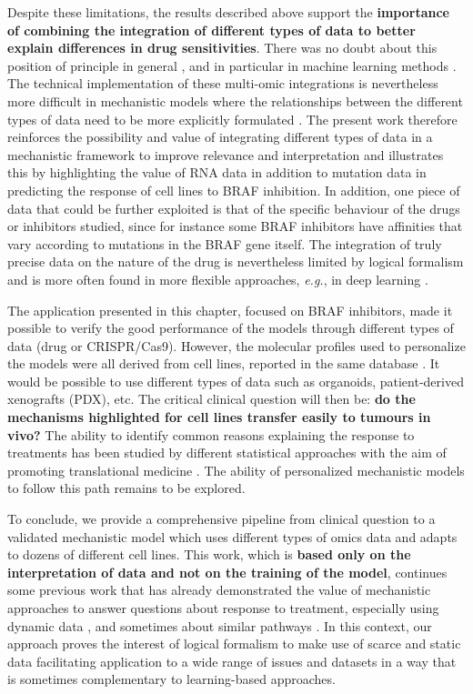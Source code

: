 \documentclass[a4paper,12pt,twoside,onecolumn,openright,final,oldfontcommands]{memoir}
\begin{document}
Despite these limitations, the results described above support the
\textbf{importance of combining the integration of different types of
data to better explain differences in drug sensitivities}. There was no
doubt about this position of principle in general
\citep{azuaje2017computational}, and in particular in machine learning
methods \citep{costello2014community, aben2016tandem}. The technical
implementation of these multi-omic integrations is nevertheless more
difficult in mechanistic models where the relationships between the
different types of data need to be more explicitly formulated
\citep{klinger2013network}. The present work therefore reinforces the
possibility and value of integrating different types of data in a
mechanistic framework to improve relevance and interpretation and
illustrates this by highlighting the value of RNA data in addition to
mutation data in predicting the response of cell lines to BRAF
inhibition. In addition, one piece of data that could be further
exploited is that of the specific behaviour of the drugs or inhibitors
studied, since for instance some BRAF inhibitors have affinities that
vary according to mutations in the BRAF gene itself. The integration of
truly precise data on the nature of the drug is nevertheless limited by
logical formalism and is more often found in more flexible approaches,
\emph{e.g.}, in deep learning \citep{manica2019toward}.

The application presented in this chapter, focused on BRAF inhibitors,
made it possible to verify the good performance of the models through
different types of data (drug or CRISPR/Cas9). However, the molecular
profiles used to personalize the models were all derived from cell
lines, reported in the same database \citep{van2019cell}. It would be
possible to use different types of data such as organoids,
patient-derived xenografts (PDX), etc. The critical clinical question
will then be: \textbf{do the mechanisms highlighted for cell lines
transfer easily to tumours in vivo?} The ability to identify common
reasons explaining the response to treatments has been studied by
different statistical approaches with the aim of promoting translational
medicine \citep{mourragui2019precise, kim2019genomic}. The ability of
personalized mechanistic models to follow this path remains to be
explored.

To conclude, we provide a comprehensive pipeline from clinical question
to a validated mechanistic model which uses different types of omics
data and adapts to dozens of different cell lines. This work, which is
\textbf{based only on the interpretation of data and not on the training
of the model}, continues some previous work that has already
demonstrated the value of mechanistic approaches to answer questions
about response to treatment, especially using dynamic data
\citep{saez2020personalized}, and sometimes about similar pathways
\citep{klinger2013network}. In this context, our approach proves the
interest of logical formalism to make use of scarce and static data
facilitating application to a wide range of issues and datasets in a way
that is sometimes complementary to learning-based approaches.
\end{document}
